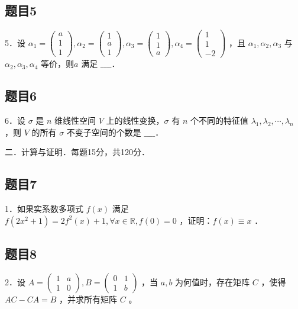 \documentclass{article}
\begin{document}
\subsection{题目5}
5．设 \(\alpha_{1}=\left(\begin{array}{l}a \\ 1 \\ 1\end{array}\right), \alpha_{2}=\left(\begin{array}{l}1 \\ a \\ 1\end{array}\right), \alpha_{3}=\left(\begin{array}{l}1 \\ 1 \\ a\end{array}\right), \alpha_{4}=\left(\begin{array}{c}1 \\ 1 \\ -2\end{array}\right)\) ，且 \(\alpha_{1}, \alpha_{2}, \alpha_{3}\) 与 \(\alpha_{2}, \alpha_{3}, \alpha_{4}\) 等价，则\(a\) 满足 \(\_\_\_\_\)．

\subsection{题目6}
6．设 \(\sigma\) 是 \(n\) 维线性空间 \(V\) 上的线性变换，\(\sigma\) 有 \(n\) 个不同的特征值 \(\lambda_{1}, \lambda_{2}, \cdots, \lambda_{n}\) ，则 \(V\) 的所有 \(\sigma\) 不变子空间的个数是 \(\_\_\_\_\)．

二．计算与证明．每题15分，共120分．\\

\subsection{题目7}
1．如果实系数多项式 \(f(x)\) 满足 \(f\left(2 x^{2}+1\right)=2 f^{2}(x)+1, \forall x \in \mathbb{R}, f(0)=0\) ，证明：\(f(x) \equiv x\) ．

\subsection{题目8}
2．设 \(A=\left(\begin{array}{ll}1 & a \\ 1 & 0\end{array}\right), B=\left(\begin{array}{ll}0 & 1 \\ 1 & b\end{array}\right)\) ，当 \(a, b\) 为何值时，存在矩阵 \(C\) ，使得 \(A C-C A=B\) ，并求所有矩阵 \(C\) 。
\end{document}
